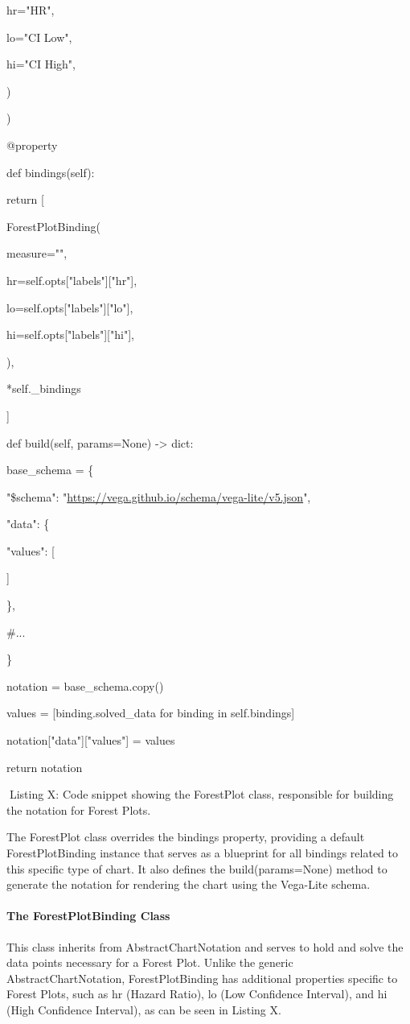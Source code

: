 \documentclass[
]{article}
\begin{document}
hr="HR",

lo="CI Low",

hi="CI High",

)

)

@property

def bindings(self):

return {[}

ForestPlotBinding(

measure="",

hr=self.opts{[}"labels"{]}{[}"hr"{]},

lo=self.opts{[}"labels"{]}{[}"lo"{]},

hi=self.opts{[}"labels"{]}{[}"hi"{]},

),

*self.\_bindings

{]}

def build(self, params=None) -\textgreater{} dict:

base\_schema = \{

"\$schema": "\url{https://vega.github.io/schema/vega-lite/v5.json}",

"data": \{

"values": {[}

{]}

\},

\#...

\}

notation = base\_schema.copy()

values = {[}binding.solved\_data for binding in self.bindings{]}

notation{[}"data"{]}{[}"values"{]} = values

return notation

Listing X: Code snippet showing the ForestPlot class, responsible for
building the notation for Forest Plots.

The ForestPlot class overrides the bindings property, providing a
default ForestPlotBinding instance that serves as a blueprint for all
bindings related to this specific type of chart. It also defines the
build(params=None) method to generate the notation for rendering the
chart using the Vega-Lite schema.

\paragraph{The ForestPlotBinding
Class}\label{the-forestplotbinding-class}

This class inherits from AbstractChartNotation and serves to hold and
solve the data points necessary for a Forest Plot. Unlike the generic
AbstractChartNotation, ForestPlotBinding has additional properties
specific to Forest Plots, such as hr (Hazard Ratio), lo (Low Confidence
Interval), and hi (High Confidence Interval), as can be seen in Listing
X.
\end{document}
